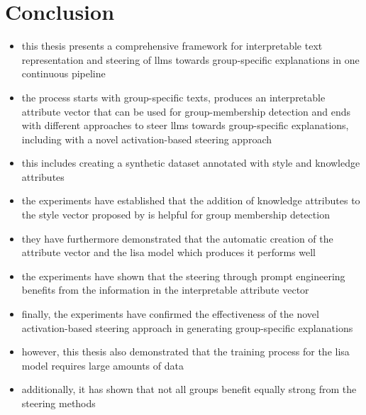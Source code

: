 \chapter{Conclusion}
\label{sec:conclusion}
\begin{itemize}
  \item this thesis presents a comprehensive framework for interpretable text representation and steering of \acp{llm} towards group-specific explanations in one continuous pipeline
  \item the process starts with group-specific texts, produces an interpretable attribute vector that can be used for group-membership detection and ends with different approaches to steer \aclp{llm} towards group-specific explanations, including with a novel activation-based steering approach
  \item this includes creating a synthetic dataset annotated with style and knowledge attributes

  \item the experiments have established that the addition of knowledge attributes to the style vector proposed by \citet{patelLearningInterpretableStyle2023} is helpful for group membership detection
  \item they have furthermore demonstrated that the automatic creation of the attribute vector and the \ac{lisa} model which produces it performs well
  \item the experiments have shown that the steering through prompt engineering benefits from the information in the interpretable attribute vector
  \item finally, the experiments have confirmed the effectiveness of the novel activation-based steering approach in generating group-specific explanations

  \item however, this thesis also demonstrated that the training process for the \ac{lisa} model requires large amounts of data
  \item additionally, it has shown that not all groups benefit equally strong from the steering methods
\end{itemize}

